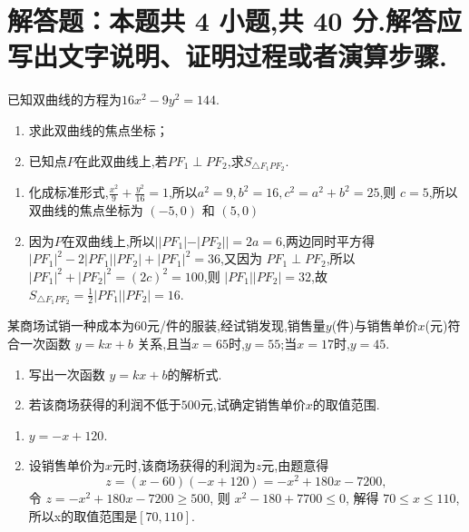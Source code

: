\documentclass{exam-zh}
\begin{document}
\section{解答题：本题共 4 小题,共 40 分.解答应写出文字说明、证明过程或者演算步骤.}

\begin{problem}[points = 8]
已知双曲线的方程为$16x^2-9y^2=144$.
\begin{enumerate}
    \item 求此双曲线的焦点坐标；
    \item 已知点$P$在此双曲线上,若$PF_1 \perp  PF_2$,求$S_{\triangle F_1PF_2}$.
\end{enumerate}

\end{problem}

\begin{solution}
\begin{enumerate}
    \item 化成标准形式,$\frac{x^2}{9}+\frac{y^2}{16}=1$,所以$a^2 = 9,b^2 =16,c^2 = a^2+b^2 = 25$,则 $c = 5$,所以双曲线的焦点坐标为 $(-5,0)$ 和 $(5,0)$ 
    \item 因为$P$在双曲线上,所以$||PF_1|-|PF_2||=2a = 6$,两边同时平方得$|PF_1|^2-2|PF_1||PF_2|+|PF_1|^2 = 36$,又因为 $PF_1\perp PF_2$,所以$|PF_1|^2+|PF_2|^2 =(2c)^2 =100$,则 $|PF_1||PF_2| =32$,故$S_{\triangle F_1PF_2} =\frac{1}{2} |PF_1||PF_2|  = 16 $.

\end{enumerate}
    
\end{solution}
  
\begin{problem}[points = 10]
某商场试销一种成本为$60$元/件的服装,经试销发现,销售量$y$(件)与销售单价$x$(元)符合一次函数 $y = k x+b$ 关系,且当$x=65$时,$y=55$;当$x = 17$时,$y=45$.
    \begin{enumerate}
        \item 写出一次函数 $y = k x +b $的解析式.
        \item 若该商场获得的利润不低于$500$元,试确定销售单价$x$的取值范围.

    \end{enumerate}
\end{problem}
\begin{solution}
    \begin{enumerate}
        \item $y = -x +120$.
        \item 设销售单价为$x$元时,该商场获得的利润为$z$元,由题意得\[
        z = (x-60) (-x+120) = -x^2 +180x-7200,\]
        令 $z = -x^2 +180x-7200 \ge 500$, 则 $x^2 -180+7700 \le 0$, 解得 $70 \le x\le 110$,
        所以x的取值范围是$[70,110]$.

    
    \end{enumerate}
        
\end{solution}
\end{document}
